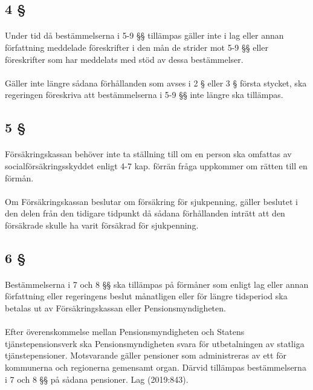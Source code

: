 \documentclass[a4paper,notitlepage,openany,10pt]{book}
\begin{document}
\subsection*{4 §}
\paragraph*{}
Under tid då bestämmelserna i 5-9 §§ tillämpas gäller inte i lag eller annan författning meddelade föreskrifter i den mån de strider mot 5-9 §§ eller föreskrifter som har meddelats med stöd av dessa bestämmelser.
\paragraph*{}
Gäller inte längre sådana förhållanden som avses i 2 § eller 3 § första stycket, ska regeringen föreskriva att bestämmelserna i 5-9 §§ inte längre ska tillämpas.
\subsection*{5 §}
\paragraph*{}
Försäkringskassan behöver inte ta ställning till om en person ska omfattas av socialförsäkringsskyddet enligt 4-7 kap. förrän fråga uppkommer om rätten till en förmån.
\paragraph*{}
Om Försäkringskassan beslutar om försäkring för sjukpenning, gäller beslutet i den delen från den tidigare tidpunkt då sådana förhållanden inträtt att den försäkrade skulle ha varit försäkrad för sjukpenning.
\subsection*{6 §}
\paragraph*{}
Bestämmelserna i 7 och 8 §§ ska tillämpas på förmåner som enligt lag eller annan författning eller regeringens beslut månatligen eller för längre tidsperiod ska betalas ut av Försäkringskassan eller Pensionsmyndigheten.
\paragraph*{}
Efter överenskommelse mellan Pensionsmyndigheten och Statens tjänstepensionsverk ska Pensionsmyndigheten svara för utbetalningen av statliga tjänstepensioner. Motsvarande gäller pensioner som administreras av ett för kommunerna och regionerna gemensamt organ. Därvid tillämpas bestämmelserna i 7 och 8 §§ på sådana pensioner.
Lag (2019:843).
\end{document}
